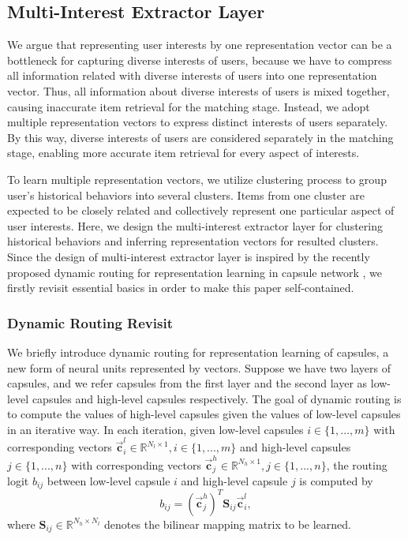 \documentclass[sigconf]{acmart}
\begin{document}
\subsection{Multi-Interest Extractor Layer}
We argue that representing user interests by one representation vector can be a bottleneck for capturing diverse interests of users, because we have to compress all information related with diverse interests of users into one representation vector.
Thus, all information about diverse interests of users is mixed together, causing inaccurate item retrieval for the matching stage.
Instead, we adopt multiple representation vectors to express distinct interests of users separately.
By this way, diverse interests of users are considered separately in the matching stage, enabling more accurate item retrieval for every aspect of interests.

To learn multiple representation vectors, we utilize clustering process to group user's historical behaviors into several clusters.
Items from one cluster are expected to be closely related and collectively represent one particular aspect of user interests.
Here, we design the multi-interest extractor layer for clustering historical behaviors and inferring representation vectors for resulted clusters.
Since the design of multi-interest extractor layer is inspired by the recently proposed dynamic routing for representation learning in capsule network \cite{hinton2011transforming,sabour2017dynamic,hinton2018matrix}, we firstly revisit essential basics in order to make this paper self-contained.

\subsubsection{Dynamic Routing Revisit}
We briefly introduce dynamic routing \cite{sabour2017dynamic} for representation learning of capsules, a new form of neural units represented by vectors.
Suppose we have two layers of capsules, and we refer capsules from the first layer and the second layer as low-level capsules and high-level capsules respectively.
The goal of dynamic routing is to compute the values of high-level capsules given the values of low-level capsules in an iterative way.
In each iteration, given low-level capsules $i \in \{ 1,...,m \}$ with corresponding vectors $\overrightarrow{\boldsymbol{c}}_i^{l} \in \mathbb{R}^{N_l \times 1}, i \in \{ 1,...,m \}$ and high-level capsules $j \in \{ 1,...,n \}$ with corresponding vectors $\overrightarrow{\boldsymbol{c}}_j^{h} \in \mathbb{R}^{N_h \times 1}, j \in \{ 1,...,n \} $, the routing logit $b_{ij}$ between low-level capsule $i$ and high-level capsule $j$ is computed by
\begin{equation}
b_{ij} = (\overrightarrow{\boldsymbol{c}}_j^{h})^T \boldsymbol{\textrm{S}}_{ij} \overrightarrow{\boldsymbol{c}}_i^{l},
\end{equation}
where $\boldsymbol{\textrm{S}}_{ij} \in \mathbb{R}^{N_h \times N_l}$ denotes the bilinear mapping matrix to be learned.
\end{document}
